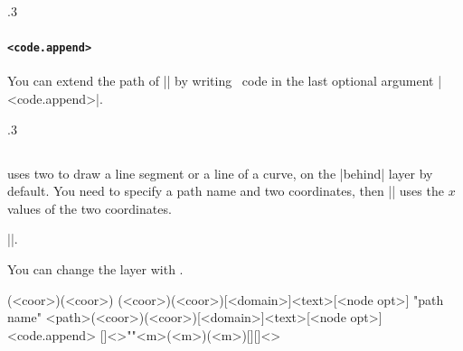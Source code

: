 \begin{tzcode}{.3}
\end{tzcode}

\paragraph{\texttt{<code.append>}}
You can extend the path of |\tzsecantat| by writing \Tikz\ code in the last optional argument |<code.append>|.

\begin{tzcode}{.3}
\end{tzcode}



\subsection{\protect\cmd{\tzsecant}}
\label{ss:tzsecant}

\icmd{\tzsecant} uses two  to draw a line segment or a  line of a curve, on the |behind| layer by default.
You need to specify a path name and two coordinates, then |\tzsecant| uses the $x$ values of the two coordinates.

 |\tzsecantat|.

You can change the layer with \icmd{\settzsecantlayer}.

\begin{tzdef}{}
(<coor>)(<coor>)
(<coor>)(<coor>)[<domain>]{<text>}[<node opt>]
"path name"
           {<path>}(<coor>)(<coor>)[<domain>]{<text>}[<node opt>]<code.append>
  []<>""{<m>}(<m>)(<m>)[]{}[]<>
\end{tzdef}


